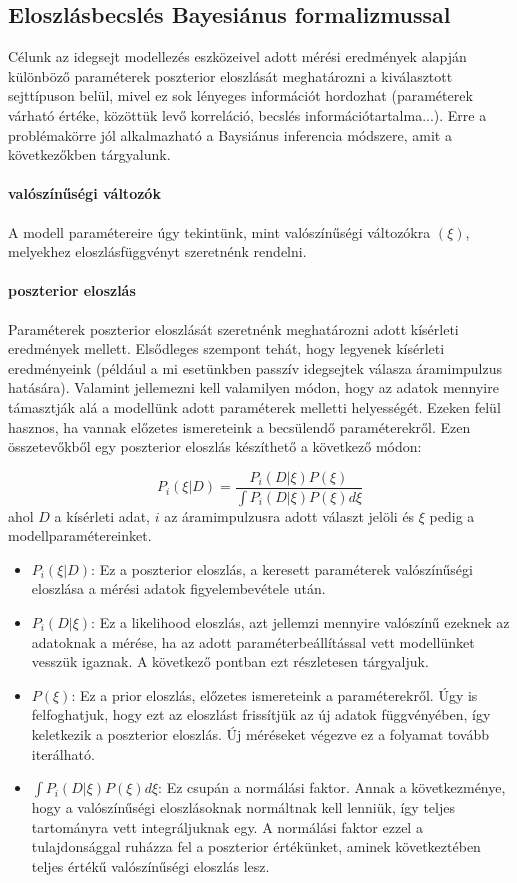 \FloatBarrier
\subsection{Eloszlásbecslés Bayesiánus formalizmussal}\label{sec:bayes}
Célunk az idegsejt modellezés eszközeivel adott mérési eredmények alapján különböző paraméterek poszterior eloszlását meghatározni a kiválasztott sejttípuson belül, mivel ez sok lényeges információt hordozhat (paraméterek várható értéke, közöttük levő korreláció, becslés információtartalma...). Erre a problémakörre jól alkalmazható a Baysiánus inferencia módszere, amit a következőkben tárgyalunk.

\paragraph{valószínűségi változók}
A modell paramétereire úgy tekintünk, mint valószínűségi változókra $(\xi)$, melyekhez eloszlásfüggvényt szeretnénk rendelni.

\paragraph{poszterior eloszlás}
Paraméterek poszterior eloszlását szeretnénk meghatározni adott kísérleti eredmények mellett.
Elsődleges szempont tehát, hogy legyenek kísérleti eredményeink (például a mi esetünkben passzív idegsejtek válasza áramimpulzus hatására). Valamint jellemezni kell valamilyen módon, hogy az adatok mennyire támasztják alá a modellünk adott paraméterek melletti helyességét. Ezeken felül hasznos, ha vannak előzetes ismereteink a becsülendő paraméterekről. Ezen összetevőkből egy poszterior eloszlás készíthető a következő módon:

\begin{equation}\label{eq:bayes}
P_i(\xi|D) = \dfrac{P_i(D|\xi)P(\xi)}{\int P_i(D|\xi)P(\xi)d\xi}
\end{equation}
ahol $D$ a kísérleti adat, $i$ az áramimpulzusra adott választ jelöli és $\xi$ pedig a modellparamétereinket.
\begin{itemize}
	\item $P_i(\xi|D)$: Ez a poszterior eloszlás, a keresett paraméterek valószínűségi eloszlása a mérési adatok figyelembevétele után.
	\item $P_i(D|\xi)$: Ez a likelihood eloszlás, azt jellemzi mennyire valószínű ezeknek az adatoknak a mérése, ha az adott paraméterbeállítással vett modellünket vesszük igaznak. A következő pontban ezt részletesen tárgyaljuk.
	\item $P(\xi)$: Ez a prior eloszlás, előzetes ismereteink a paraméterekről. Úgy is felfoghatjuk, hogy ezt az eloszlást frissítjük az új adatok függvényében, így keletkezik a poszterior eloszlás. Új méréseket végezve ez a folyamat tovább iterálható.
	\item $\int P_i(D|\xi)P(\xi)d\xi$: Ez csupán a normálási faktor. Annak a következménye, hogy a valószínűségi eloszlásoknak normáltnak kell lenniük, így teljes tartományra vett integráljuknak egy. A normálási faktor ezzel a tulajdonsággal ruházza fel a poszterior értékünket, aminek következtében teljes értékű valószínűségi eloszlás lesz.
\end{itemize}

